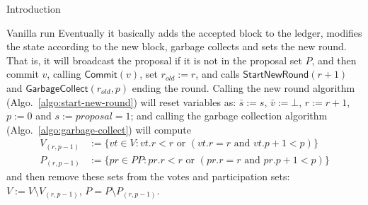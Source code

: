 \documentclass[10pt,a4paper]{article}
\begin{document}
\begin{section}{Introduction}
\begin{subsection}{Vanilla run}
Eventually it basically adds the accepted block to the ledger, modifies the state according
to the new block, garbage collects and sets the new round.
That is, it will broadcast the proposal if it is not in the proposal set $P$,
and then commit $v$, calling $\mathsf{Commit}(v)$, set $r_{old}:=r$,
and calls $\mathsf{StartNewRound}(r+1)$ and $\mathsf{GarbageCollect}(r_{old},p)$
ending the round.
Calling the new round algorithm (Algo.~\ref{algo:start-new-round}) will
reset variables as: $\bar s:=s$, $\bar{v}:=\bot$, $r:=r+1$, $p:=0$ and
$s:=proposal=1$;
and calling the garbage collection algorithm (Algo.~\ref{algo:garbage-collect}) 
will compute 
$$
\begin{array}{rl}
V_{(r,p-1)} & :=\{vt\in V : vt.r < r \text{ or } (vt.r = r \text{ and } vt.p + 1 < p)\}\\
P_{(r,p-1)} & :=\{pr\in PP: pr.r < r \text{ or } (pr.r = r \text{ and } pr.p + 1 < p)\}
\end{array}
$$%
and then remove these sets from the votes and participation sets: $V:=V\setminus V_{(r,p-1)}$,
$P = P\setminus P_{(r,p-1)}$.






\end{subsection}

\end{section}
\end{document}
